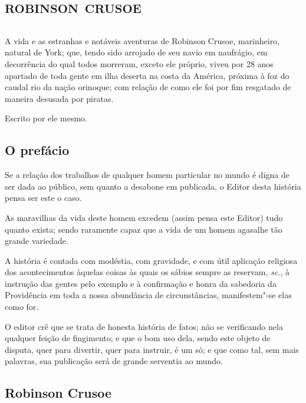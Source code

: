 \part{\textsc{robinson crusoe}}

\chapter*{}
\thispagestyle{empty}


\vfill
A vida e as estranhas e notáveis aventuras de Robinson Crusoe,
marinheiro, natural de York; que, tendo sido arrojado de seu navio em
naufrágio, em decorrência do qual todos morreram, exceto ele próprio,
viveu por 28 anos apartado de toda gente em ilha deserta na costa da
América, próxima à foz do caudal rio da nação orinoque; com relação de
como ele foi por fim resgatado de maneira desusada por piratas.

\hfill{}Escrito por ele mesmo.

\chapter{O prefácio}

Se a relação dos trabalhos de qualquer homem particular no mundo é digna
de ser dada ao público, sem quanto a desabone em publicada, o Editor
desta história pensa ser este o caso.

As maravilhas da vida deste homem excedem (assim pensa este Editor) tudo
quanto exista; sendo raramente capaz que a vida de um homem agasalhe tão
grande variedade.

A história é contada com modéstia, com gravidade, e com útil aplicação
religiosa dos acontecimentos àquelas coisas às quais os sábios sempre as
reservam, \emph{sc.}, à instrução das gentes pelo exemplo e à
confirmação e honra da sabedoria da Providência em toda a nossa
abundância de circunstâncias, manifestem"-se elas como for.

O editor crê que se trata de honesta história de fatos; não se
verificando nela qualquer feição de fingimento; e que o bom uso dela,
sendo este objeto de disputa, quer para divertir, quer para instruir, é
um só; e que como tal, sem mais palavras, sua publicação será de grande
serventia ao mundo.

\asterisc

\chapter{Robinson Crusoe}

